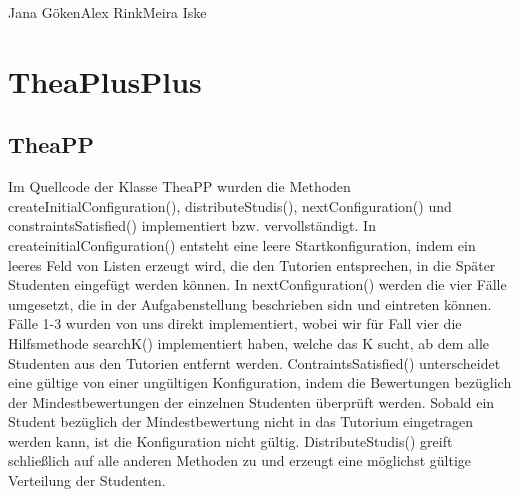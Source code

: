 \documentclass{pi2}
\begin{document}
%


          {Jana Göken}{Alex Rink}{Meira Iske}
\section{TheaPlusPlus}
\subsection{TheaPP}

Im Quellcode der Klasse TheaPP wurden die Methoden createInitialConfiguration(), distributeStudis(), nextConfiguration() und constraintsSatisfied() implementiert bzw. vervollständigt. In createinitialConfiguration() entsteht eine leere Startkonfiguration, indem ein leeres Feld von Listen erzeugt wird, die den Tutorien entsprechen, in die Später Studenten eingefügt werden können. In nextConfiguration() werden die vier Fälle umgesetzt, die in der Aufgabenstellung beschrieben sidn und eintreten können. Fälle 1-3 wurden von uns direkt implementiert, wobei wir für Fall vier die Hilfsmethode searchK() implementiert haben, welche das K sucht, ab dem alle Studenten aus den Tutorien entfernt werden. 
ContraintsSatisfied() unterscheidet eine gültige von einer ungültigen Konfiguration, indem die Bewertungen bezüglich der Mindestbewertungen der einzelnen Studenten überprüft werden. Sobald ein Student bezüglich der Mindestbewertung nicht in das Tutorium eingetragen werden kann, ist die Konfiguration nicht gültig. 
DistributeStudis() greift schließlich auf alle anderen Methoden zu und erzeugt eine möglichst gültige Verteilung der Studenten.
\end{document}
